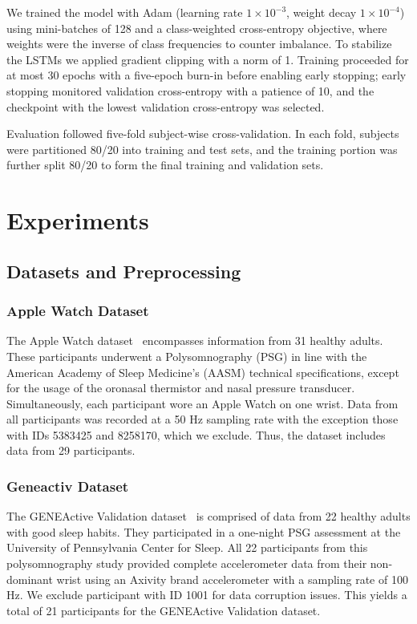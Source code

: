 \documentclass[journal,twoside,web]{ieeecolor}
\begin{document}
We trained the model with Adam (learning rate $1\times10^{-3}$, weight decay $1\times10^{-4}$) using mini-batches of 128 and a class-weighted cross-entropy objective, where weights were the inverse of class frequencies to counter imbalance. To stabilize the LSTMs we applied gradient clipping with a norm of 1. Training proceeded for at most 30 epochs with a five-epoch burn-in before enabling early stopping; early stopping monitored validation cross-entropy with a patience of 10, and the checkpoint with the lowest validation cross-entropy was selected.

Evaluation followed five-fold subject-wise cross-validation. In each fold, subjects were partitioned 80/20 into training and test sets, and the training portion was further split 80/20 to form the final training and validation sets.
\section{Experiments}
\subsection{Datasets and Preprocessing}
\subsubsection{Apple Watch Dataset}

The Apple Watch dataset~\cite{walch2019sleep} encompasses information from 31 healthy adults. These participants underwent a Polysomnography (PSG) in line with the American Academy of Sleep Medicine's (AASM) technical specifications, except for the usage of the oronasal thermistor and nasal pressure transducer. Simultaneously, each participant wore an Apple Watch on one wrist. Data from all participants was recorded at a 50 Hz sampling rate with the exception those with IDs 5383425 and 8258170, which we exclude. Thus, the dataset includes data from 29 participants.
\subsubsection{Geneactiv Dataset}
The GENEActive Validation dataset~\cite{van2018estimating} is comprised of data from 22 healthy adults with good sleep habits. They participated in a one-night PSG assessment at the University of Pennsylvania Center for Sleep. All 22 participants from this polysomnography study provided complete accelerometer data from their non-dominant wrist using an Axivity brand accelerometer with a sampling rate of 100 Hz. We exclude participant with ID 1001 for data corruption issues. This yields a total of 21 participants for the GENEActive Validation dataset.
\end{document}
